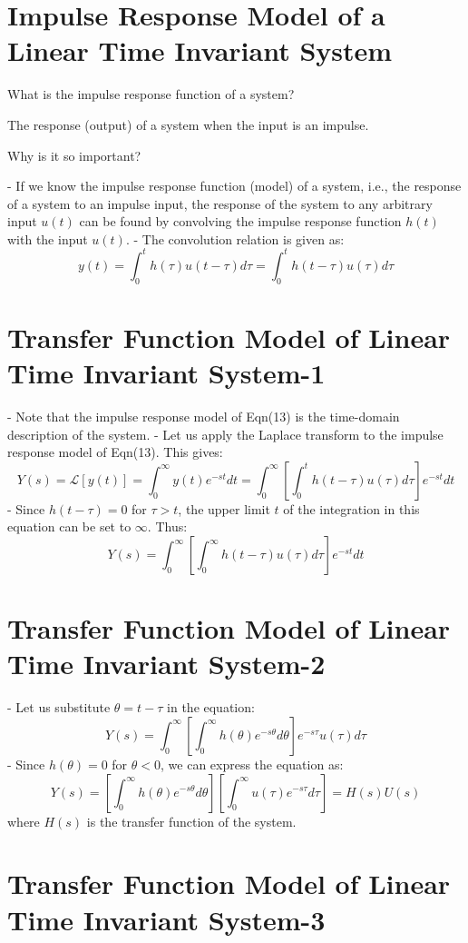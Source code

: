 \documentclass[../notes-main.tex]{subfiles}
\begin{document}
\section{Impulse Response Model of a Linear Time Invariant System}

What is the impulse response function of a system?

The response (output) of a system when the input is an impulse.

Why is it so important?

- If we know the impulse response function (model) of a system, i.e., the response of a system to an impulse input, the response of the system to any arbitrary input \( u(t) \) can be found by convolving the impulse response function \( h(t) \) with the input \( u(t) \).
- The convolution relation is given as:
\[
y(t) = \int_{0}^{t} h(\tau)u(t-\tau)d\tau = \int_{0}^{t} h(t-\tau)u(\tau)d\tau
\]
\section{Transfer Function Model of Linear Time Invariant System-1}

- Note that the impulse response model of Eqn(13) is the time-domain description of the system.
- Let us apply the Laplace transform to the impulse response model of Eqn(13). This gives:
\[
Y(s) = \mathcal{L}[y(t)] = \int_{0}^{\infty} y(t)e^{-st}dt = \int_{0}^{\infty} \left[\int_{0}^{t} h(t-\tau)u(\tau)d\tau\right]e^{-st}dt
\]
- Since \( h(t-\tau) = 0 \) for \( \tau > t \), the upper limit \( t \) of the integration in this equation can be set to \( \infty \). Thus:
\[
Y(s) = \int_{0}^{\infty} \left[\int_{0}^{\infty} h(t-\tau)u(\tau)d\tau\right]e^{-st}dt
\]

\section{Transfer Function Model of Linear Time Invariant System-2}

- Let us substitute \( \theta = t-\tau \) in the equation:
\[
Y(s) = \int_{0}^{\infty} \left[\int_{0}^{\infty} h(\theta)e^{-s\theta}d\theta\right]e^{-s\tau}u(\tau)d\tau
\]
- Since \( h(\theta) = 0 \) for \( \theta < 0 \), we can express the equation as:
\[
Y(s) = \left[\int_{0}^{\infty} h(\theta)e^{-s\theta}d\theta\right]\left[\int_{0}^{\infty} u(\tau)e^{-s\tau}d\tau\right] = H(s)U(s)
\]
where \( H(s) \) is the transfer function of the system.
\section{Transfer Function Model of Linear Time Invariant System-3}
\end{document}
